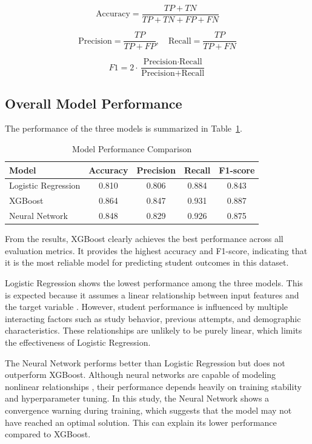 \documentclass[conference]{IEEEtran}
\begin{document}
\[
\text{Accuracy} = \frac{TP + TN}{TP + TN + FP + FN}
\]

\[
\text{Precision} = \frac{TP}{TP + FP}, \quad
\text{Recall} = \frac{TP}{TP + FN}
\]

\[
F1 = 2 \cdot \frac{\text{Precision} \cdot \text{Recall}}{\text{Precision} + \text{Recall}}
\]

\subsection{Overall Model Performance}

The performance of the three models is summarized in Table~\ref{tab:results}.

\begin{table}[h]
\centering
\caption{Model Performance Comparison}
\label{tab:results}
\begin{tabular}{lcccc}
\hline
Model & Accuracy & Precision & Recall & F1-score \\
\hline
Logistic Regression & 0.810 & 0.806 & 0.884 & 0.843 \\
XGBoost & 0.864 & 0.847 & 0.931 & 0.887 \\
Neural Network & 0.848 & 0.829 & 0.926 & 0.875 \\
\hline
\end{tabular}
\end{table}

From the results, XGBoost clearly achieves the best performance across all evaluation metrics. It provides the highest accuracy and F1-score, indicating that it is the most reliable model for predicting student outcomes in this dataset.

Logistic Regression shows the lowest performance among the three models. This is expected because it assumes a linear relationship between input features and the target variable \cite{sitompul2025}. However, student performance is influenced by multiple interacting factors such as study behavior, previous attempts, and demographic characteristics. These relationships are unlikely to be purely linear, which limits the effectiveness of Logistic Regression.

The Neural Network performs better than Logistic Regression but does not outperform XGBoost. Although neural networks are capable of modeling nonlinear relationships \cite{chong2025}, their performance depends heavily on training stability and hyperparameter tuning. In this study, the Neural Network shows a convergence warning during training, which suggests that the model may not have reached an optimal solution. This can explain its lower performance compared to XGBoost.
\end{document}
